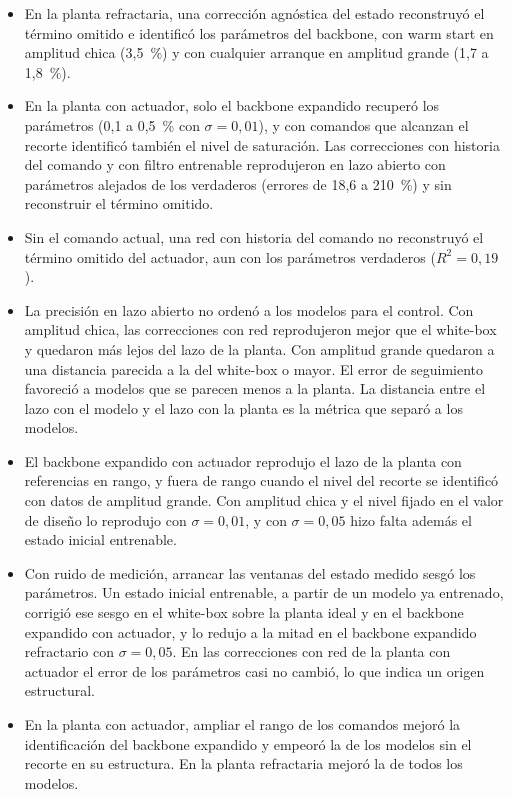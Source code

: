 \documentclass[11pt,a4paper]{article}
\begin{document}
\begin{itemize}[leftmargin=*,itemsep=0.35em]
\item En la planta refractaria, una corrección agnóstica del estado reconstruyó el término omitido e identificó los parámetros del backbone, con warm start en amplitud chica (3,5~\%) y con cualquier arranque en amplitud grande (1,7 a 1,8~\%).
\item En la planta con actuador, solo el backbone expandido recuperó los parámetros (0,1 a 0,5~\% con $\sigma = 0{,}01$), y con comandos que alcanzan el recorte identificó también el nivel de saturación. Las correcciones con historia del comando y con filtro entrenable reprodujeron en lazo abierto con parámetros alejados de los verdaderos (errores de 18,6 a 210~\%) y sin reconstruir el término omitido.
\item Sin el comando actual, una red con historia del comando no reconstruyó el término omitido del actuador, aun con los parámetros verdaderos ($R^2 = 0{,}19$).
\item La precisión en lazo abierto no ordenó a los modelos para el control. Con amplitud chica, las correcciones con red reprodujeron mejor que el white-box y quedaron más lejos del lazo de la planta. Con amplitud grande quedaron a una distancia parecida a la del white-box o mayor. El error de seguimiento favoreció a modelos que se parecen menos a la planta. La distancia entre el lazo con el modelo y el lazo con la planta es la métrica que separó a los modelos.
\item El backbone expandido con actuador reprodujo el lazo de la planta con referencias en rango, y fuera de rango cuando el nivel del recorte se identificó con datos de amplitud grande. Con amplitud chica y el nivel fijado en el valor de diseño lo reprodujo con $\sigma = 0{,}01$, y con $\sigma = 0{,}05$ hizo falta además el estado inicial entrenable.
\item Con ruido de medición, arrancar las ventanas del estado medido sesgó los parámetros. Un estado inicial entrenable, a partir de un modelo ya entrenado, corrigió ese sesgo en el white-box sobre la planta ideal y en el backbone expandido con actuador, y lo redujo a la mitad en el backbone expandido refractario con $\sigma = 0{,}05$. En las correcciones con red de la planta con actuador el error de los parámetros casi no cambió, lo que indica un origen estructural.
\item En la planta con actuador, ampliar el rango de los comandos mejoró la identificación del backbone expandido y empeoró la de los modelos sin el recorte en su estructura. En la planta refractaria mejoró la de todos los modelos.
\end{itemize}
\end{document}
